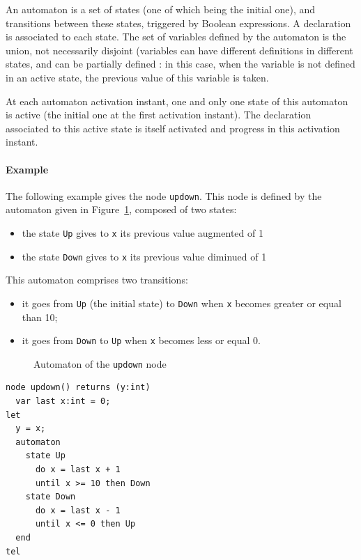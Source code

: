 \documentclass[a4paper]{article}
\begin{document}
An automaton is a set of states (one of which being the initial one), and
transitions between these states, triggered by Boolean expressions. A
declaration is associated to each state. The set of variables defined by the
automaton is the union, not necessarily disjoint (variables can have different
definitions in different states, and can be partially defined : in this case,
when the variable is not defined in an active state, the previous value of this
variable is taken.

At each automaton activation instant, one and only one state of this automaton
is active (the initial one at the first activation instant). The declaration
associated to this active state is itself activated and progress in this
activation instant.

\paragraph{Example}
\label{sec:example}

The following example gives the node \texttt{updown}. This node is defined by the
automaton given in Figure~\ref{fig:updown-automaton}, composed of two states:
\begin{itemize}
\item the state \texttt{Up} gives to \texttt{x} its previous value augmented of 1
\item the state \texttt{Down} gives to \texttt{x} its previous value diminued of 1
\end{itemize}
This automaton comprises two transitions:
\begin{itemize}
\item it goes from \texttt{Up} (the initial state) to \texttt{Down} when
  \texttt{x} becomes greater or equal than 10;
\item it goes from \texttt{Down} to \texttt{Up} when \texttt{x} becomes less or
  equal 0.
\end{itemize}

\begin{figure}[htb]
  \centering
  
  \caption{Automaton of the \texttt{updown} node}
  \label{fig:updown-automaton}
\end{figure}

\begin{lstlisting}
node updown() returns (y:int)
  var last x:int = 0;
let
  y = x;
  automaton
    state Up
      do x = last x + 1
      until x >= 10 then Down
    state Down
      do x = last x - 1
      until x <= 0 then Up
  end
tel
\end{lstlisting}
\end{document}
